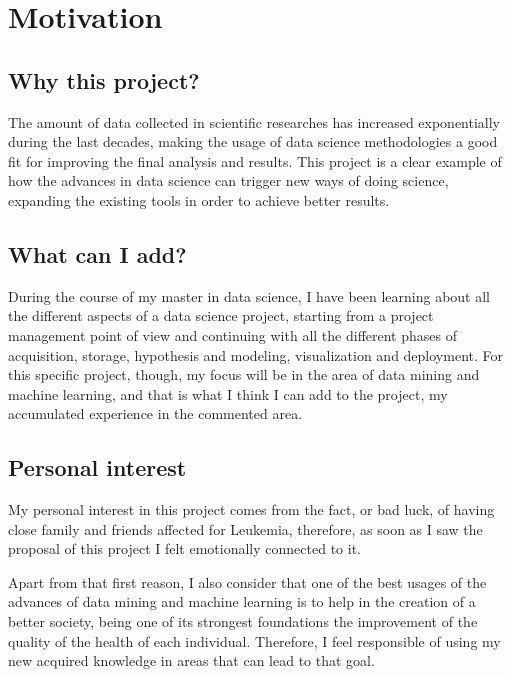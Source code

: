 

\section{Motivation}

\subsection{Why this project?}
The amount of data collected in scientific researches has increased exponentially during the last decades, making the usage of data science methodologies a good fit for improving the final analysis and results.
This project is a clear example of how the advances in data science can trigger new ways of doing science, expanding the existing tools in order to achieve better results.

\subsection{What can I add?}
During the course of my master in data science, I have been learning about all the different aspects of a data science project, starting from a project management point of view and continuing with all the different phases of acquisition, storage, hypothesis and modeling, visualization and deployment.
For this specific project, though, my focus will be in the area of data mining and machine learning, and that is what I think I can add to the project, my accumulated experience in the commented area.

\subsection{Personal interest}
My personal interest in this project comes from the fact, or bad luck, of having close family and friends affected for Leukemia, therefore, as soon as I saw the proposal of this project I felt emotionally connected to it.

Apart from that first reason, I also consider that one of the best usages of the advances of data mining and machine learning is to help in the creation of a better society, being one of its strongest foundations the improvement of the quality of the health of each individual. Therefore, I feel responsible of using my new acquired knowledge in areas that can lead to that goal.

